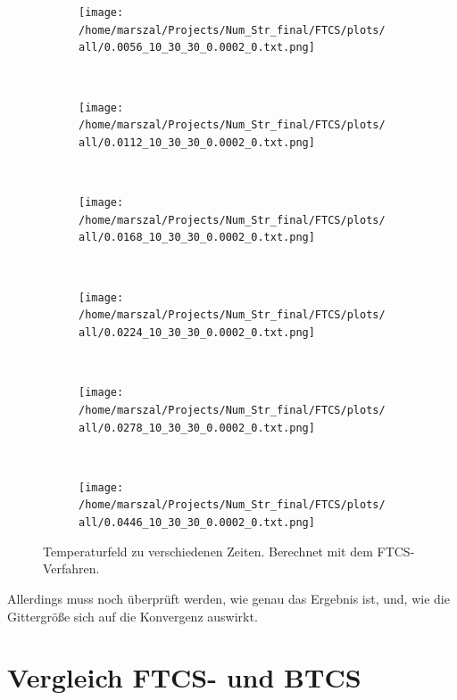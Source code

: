 \begin{figure}
\centering
  \begin{subfigure}[b]{0.48\textwidth}
    \texttt{[image: /home/marszal/Projects/Num\_Str\_final/FTCS/plots/all/0.0056\_10\_30\_30\_0.0002\_0.txt.png]}
  \end{subfigure}
  ~
  \begin{subfigure}[b]{0.48\textwidth}
    \texttt{[image: /home/marszal/Projects/Num\_Str\_final/FTCS/plots/all/0.0112\_10\_30\_30\_0.0002\_0.txt.png]}
  \end{subfigure}
  \\
  \begin{subfigure}[b]{0.48\textwidth}
    \texttt{[image: /home/marszal/Projects/Num\_Str\_final/FTCS/plots/all/0.0168\_10\_30\_30\_0.0002\_0.txt.png]}
  \end{subfigure}
  ~
  \begin{subfigure}[b]{0.48\textwidth}
    \texttt{[image: /home/marszal/Projects/Num\_Str\_final/FTCS/plots/all/0.0224\_10\_30\_30\_0.0002\_0.txt.png]}
  \end{subfigure}
  \\
  \begin{subfigure}[b]{0.48\textwidth}
    \texttt{[image: /home/marszal/Projects/Num\_Str\_final/FTCS/plots/all/0.0278\_10\_30\_30\_0.0002\_0.txt.png]}
  \end{subfigure}
  ~
  \begin{subfigure}[b]{0.48\textwidth}
    \texttt{[image: /home/marszal/Projects/Num\_Str\_final/FTCS/plots/all/0.0446\_10\_30\_30\_0.0002\_0.txt.png]}
  \end{subfigure}
\caption{Temperaturfeld zu verschiedenen Zeiten. Berechnet mit dem FTCS-Verfahren.}\label{fig:FTCSnaive}
\end{figure}

Allerdings muss noch überprüft werden, wie genau das Ergebnis ist, und, wie die Gittergröße sich auf die Konvergenz auswirkt.

\section{Vergleich FTCS- und BTCS}


